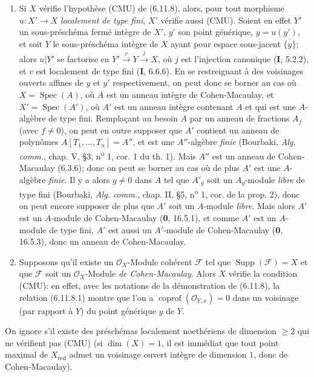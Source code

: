 \begin{remarks}[6.11.9]
\label{IV.2.s6.11.9-fr}
\begin{enumerate}
\item[(i)] Si $X$ vérifie l'hypothèse (CMU) de (6.11.8), alors, pour tout
morphisme $u:X'\to X$ \emph{localement de type fini}, $X'$ vérifie aussi (CMU).
Soient en effet $Y'$ un sous-préschéma fermé intègre de $X'$, $y'$ son point
générique, $y=u(y')$, et soit $Y$ le sous-préschéma intègre de $X$ ayant
pour espace sous-jacent $\overline{\{y\}}$; alors $u|Y'$ se factorise en
$Y'\xrightarrow{v}Y\xrightarrow{j}X$, où $j$ est l'injection canonique
(\textbf{I}, 5.2.2), et $v$ est localement de type fini (\textbf{I}, 6.6.6). En se
restreignant à des voisinages ouverts affines de $y$ et $y'$ respectivement,
on peut donc se borner au cas où $X=\operatorname{Spec}(A)$, où $A$ est un
anneau intègre de Cohen-Macaulay, et $X'=\operatorname{Spec}(A')$, où $A'$
est un anneau
intègre contenant $A$ et qui est une $A$-algèbre de type fini.
Remplaçant au besoin $A$ par un anneau de fractions $A_f$ (avec $f\ne0$),
on peut en outre supposer que $A'$ contient un anneau de polynômes
$A[T_1,\ldots,T_n]=A''$, et est une $A''$-algèbre \emph{finie} (Bourbaki,
\emph{Alg. comm.}, chap. V, \S3, n\textsuperscript{o} 1, cor. 1 du th. 1).
Mais $A''$ est un anneau de Cohen-Macaulay (6.3.6); donc on peut se borner
au cas où de plus $A'$ est une $A$-algèbre \emph{finie}. Il y a alors $g\ne0$ dans
$A$ tel que $A'_g$ soit un $A_g$-module \emph{libre} de type fini (Bourbaki,
\emph{Alg. comm.}, chap. II, \S5, n\textsuperscript{o} 1, cor. de la
prop. 2), donc on peut encore supposer de plus que $A'$ soit un $A$-module
\emph{libre}. Mais alors $A'$ est un $A$-module de Cohen-Macaulay (\textbf{0}, 16.5.1), et
comme $A'$ est un $A$-module de type fini, $A'$ est aussi un $A'$-module de
Cohen-Macaulay (\textbf{0}, 16.5.3), donc un anneau de Cohen-Macaulay.
\item[(ii)] Supposons qu'il existe un $\mathcal O_X$-Module cohérent
$\mathcal F$ tel que $\operatorname{Supp}(\mathcal F)=X$ et que
$\mathcal F$ soit un $\mathcal O_X$-Module \emph{de Cohen-Macaulay}. Alors $X$
vérifie la condition (CMU): en effet, avec les notations de la démonstration
de (6.11.8), la relation (6.11.8.1) montre que l'on a
$\operatorname{coprof}(\mathcal O_{Y,x})=0$ dans un voisinage (par rapport
à $Y$) du point générique $y$ de $Y$.
\end{enumerate}

On ignore s'il existe des préschémas localement noethériens de dimension
$\geq2$ qui ne vérifient pas (CMU) (si $\dim(X)=1$, il est immédiat que tout
point maximal de $X_{\mathrm{red}}$ admet un voisinage ouvert intègre de
dimension $1$, donc de Cohen-Macaulay).
\end{remarks}

